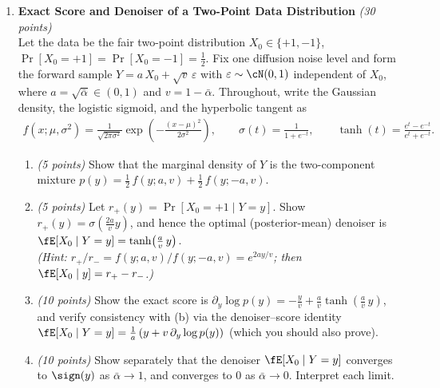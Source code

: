 \documentclass[12pt]{article}
\begin{document}
\begin{enumerate}

\item {\bf Exact Score and Denoiser of a Two-Point Data Distribution} {\it (30 points)}\\
Let the data be the fair two-point distribution $X_0 \in \{+1, -1\}$, $\Pr[X_0 = +1] = \Pr[X_0 = -1] = \tfrac12$. Fix one diffusion noise level and form the forward sample $Y = a\,X_0 + \sqrt{v}\,\varepsilon$ with $\varepsilon \sim \cN(0,1)$ independent of $X_0$, where $a = \sqrt{\bar{\alpha}} \in (0,1)$ and $v = 1-\bar{\alpha}$. Throughout, write the Gaussian density, the logistic sigmoid, and the hyperbolic tangent as
\begin{align*}
    f(x;\mu,\sigma^2) = \frac{1}{\sqrt{2\pi\sigma^2}}\exp\!\left(-\frac{(x-\mu)^2}{2\sigma^2}\right), \qquad
    \sigma(t) = \frac{1}{1+e^{-t}}, \qquad
    \tanh(t) = \frac{e^{t}-e^{-t}}{e^{t}+e^{-t}}.
\end{align*}
\begin{enumerate}
    \item {\it (5 points)} Show that the marginal density of $Y$ is the two-component mixture $p(y) = \tfrac12\,f(y; a, v) + \tfrac12\,f(y; -a, v)$.

    \item {\it (5 points)} Let $r_+(y) = \Pr[X_0 = +1 \mid Y = y]$. Show $r_+(y) = \sigma\!\left(\tfrac{2a}{v}y\right)$, and hence the optimal (posterior-mean) denoiser is $\fE[X_0 \mid Y = y] = \tanh\!\left(\tfrac{a}{v}\,y\right)$.\\
    \emph{(Hint: $r_+/r_- = f(y;a,v)/f(y;-a,v) = e^{2ay/v}$; then $\fE[X_0 \mid y] = r_+ - r_-$.)}

    \item {\it (10 points)} Show the exact score is $\partial_y \log p(y) = -\tfrac{y}{v} + \tfrac{a}{v}\tanh\!\left(\tfrac{a}{v}\,y\right)$, and verify consistency with (b) via the denoiser--score identity $\fE[X_0 \mid Y = y] = \tfrac{1}{a}\left(y + v\,\partial_y \log p(y)\right)$ (which you should also prove).

    \item {\it (10 points)} Show separately that the denoiser $\fE[X_0 \mid Y = y]$ converges to $\sign(y)$ as $\bar{\alpha} \to 1$, and converges to $0$ as $\bar{\alpha} \to 0$. Interpret each limit.
\end{enumerate}


\end{enumerate}
\end{document}

